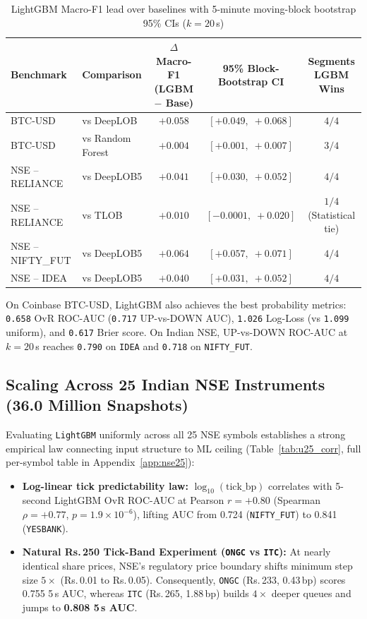\documentclass[12pt,a4paper,oneside]{report}
\newcommand{\code}[1]{\texttt{#1}}
\begin{document}
\begin{table}[H]
\centering\scriptsize
\setlength{\tabcolsep}{4pt}
\caption{LightGBM Macro-F1 lead over baselines with 5-minute moving-block bootstrap 95\% CIs ($k=20$\,s)}
\label{tab:bootstrap_ci}
\begin{tabular}{@{}llccc@{}}
\toprule
\textbf{Benchmark} & \textbf{Comparison} & \textbf{$\Delta$ Macro-F1 (LGBM $-$ Base)} & \textbf{95\% Block-Bootstrap CI} & \textbf{Segments LGBM Wins} \\
\midrule
BTC-USD & vs DeepLOB & $+0.058$ & $[+0.049,\; +0.068]$ & $4/4$ \\
BTC-USD & vs Random Forest & $+0.004$ & $[+0.001,\; +0.007]$ & $3/4$ \\
NSE -- RELIANCE & vs DeepLOB5 & $+0.041$ & $[+0.030,\; +0.052]$ & $4/4$ \\
NSE -- RELIANCE & vs TLOB & $+0.010$ & $[-0.0001,\; +0.020]$ & $1/4$ (Statistical tie) \\
NSE -- NIFTY\_FUT & vs DeepLOB5 & $+0.064$ & $[+0.057,\; +0.071]$ & $4/4$ \\
NSE -- IDEA & vs DeepLOB5 & $+0.040$ & $[+0.031,\; +0.052]$ & $4/4$ \\
\bottomrule
\end{tabular}
\end{table}

On Coinbase BTC-USD, LightGBM also achieves the best probability metrics: \code{0.658} OvR ROC-AUC (\code{0.717} UP-vs-DOWN AUC), \code{1.026} Log-Loss (vs \code{1.099} uniform), and \code{0.617} Brier score. On Indian NSE, UP-vs-DOWN ROC-AUC at $k=20$\,s reaches \code{0.790} on \code{IDEA} and \code{0.718} on \code{NIFTY\_FUT}.

\subsection{Scaling Across 25 Indian NSE Instruments (36.0 Million Snapshots)}

Evaluating \code{LightGBM} uniformly across all 25 NSE symbols establishes a strong empirical law connecting input structure to ML ceiling (Table~\ref{tab:u25_corr}, full per-symbol table in Appendix~\ref{app:nse25}):
\begin{itemize}
  \item \textbf{Log-linear tick predictability law:} $\log_{10}(\text{tick\_bp})$ correlates with 5-second LightGBM OvR ROC-AUC at Pearson $r = +0.80$ (Spearman $\rho = +0.77$, $p = 1.9 \times 10^{-6}$), lifting AUC from 0.724 (\code{NIFTY\_FUT}) to 0.841 (\code{YESBANK}).
  \item \textbf{Natural Rs.\,250 Tick-Band Experiment (\code{ONGC} vs \code{ITC}):} At nearly identical share prices, NSE's regulatory price boundary shifts minimum step size $5\times$ (Rs.\,0.01 to Rs.\,0.05). Consequently, \code{ONGC} (Rs.\,233, 0.43\,bp) scores 0.755 5\,s AUC, whereas \code{ITC} (Rs.\,265, 1.88\,bp) builds $4\times$ deeper queues and jumps to \textbf{0.808 5\,s AUC}.
\end{itemize}
\end{document}
